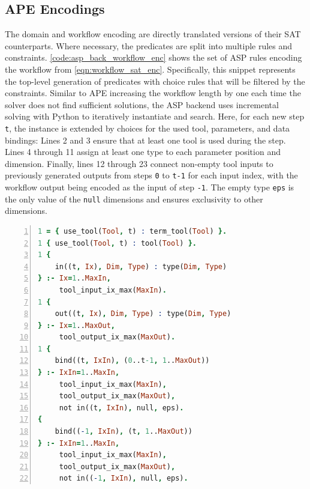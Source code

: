 \subsection{APE Encodings}
The domain and workflow encoding are directly translated versions of their SAT counterparts. Where necessary, the predicates are split into multiple rules and constraints. \autoref{code:asp_back_workflow_enc} shows the set of ASP rules encoding the workflow from \autoref{eqn:workflow_sat_enc}. Specifically, this snippet represents the top-level generation of predicates with choice rules that will be filtered by the constraints. Similar to APE increasing the workflow length by one each time the solver does not find sufficient solutions, the ASP backend uses incremental solving with Python to iteratively instantiate and search. Here, for each new step \verb|t|, the instance is extended by choices for the used tool, parameters, and data bindings: Lines 2 and 3 ensure that at least one tool is used during the step. Lines 4 through 11 assign at least one type to each parameter position and dimension. Finally, lines 12 through 23 connect non-empty tool inputs to previously generated outputs from steps \verb|0| to \verb|t-1| for each input index, with the workflow output being encoded as the input of step \verb|-1|. The empty type \verb|eps| is the only value of the \verb|null| dimensions and ensures exclusivity to other dimensions.

\resetJsonFlag
\begin{lstlisting}[language=Prolog, caption=SAT Workflow Predicate Encoded as ASP Rules., label=code:asp_back_workflow_enc, numbers=left,numberstyle=\tiny]
% [[W]]_n 
1 = { use_tool(Tool, t) : term_tool(Tool) }.
1 { use_tool(Tool, t) : tool(Tool) }.
1 {
    in((t, Ix), Dim, Type) : type(Dim, Type)
} :- Ix=1..MaxIn,
     tool_input_ix_max(MaxIn).
1 {
    out((t, Ix), Dim, Type) : type(Dim, Type)
} :- Ix=1..MaxOut,
     tool_output_ix_max(MaxOut).
1 {
    bind((t, IxIn), (0..t-1, 1..MaxOut))
} :- IxIn=1..MaxIn,
     tool_input_ix_max(MaxIn),
     tool_output_ix_max(MaxOut),
     not in((t, IxIn), null, eps).
{
    bind((-1, IxIn), (t, 1..MaxOut))
} :- IxIn=1..MaxIn,
     tool_input_ix_max(MaxIn),
     tool_output_ix_max(MaxOut),
     not in((-1, IxIn), null, eps).
\end{lstlisting}

